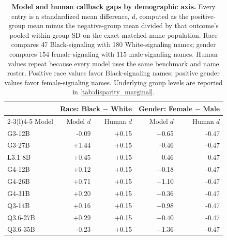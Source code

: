 \begin{table}[H]
\centering
\scriptsize
\setlength{\tabcolsep}{2.2pt}
\begin{tabular}{@{}lrrrr@{}}
\toprule
& \multicolumn{2}{c}{Race: Black $-$ White} & \multicolumn{2}{c}{Gender: Female $-$ Male} \\
\cmidrule(lr){2-3}\cmidrule(l){4-5}
Model & Model $d$ & Human $d$ & Model $d$ & Human $d$ \\
\midrule
G3-12B & -0.09 & +0.15 & +0.65 & -0.47 \\
G3-27B & +1.44 & +0.15 & -0.46 & -0.47 \\
L3.1-8B & +0.45 & +0.15 & +0.46 & -0.47 \\
G4-12B & +0.12 & +0.15 & +0.18 & -0.47 \\
G4-26B & +0.71 & +0.15 & +1.10 & -0.47 \\
G4-31B & +0.20 & +0.15 & +0.36 & -0.47 \\
Q3-14B & +0.16 & +0.15 & +0.98 & -0.47 \\
Q3.6-27B & +0.29 & +0.15 & +0.40 & -0.47 \\
Q3.6-35B & -0.23 & +0.15 & +1.36 & -0.47 \\
\bottomrule
\end{tabular}
\caption{\textbf{Model and human callback gaps by demographic axis.} Every entry is a standardized mean difference, $d$, computed as the positive-group mean minus the negative-group mean divided by that outcome's pooled within-group SD on the exact matched-name population. Race compares 47 Black-signaling with 180 White-signaling names; gender compares 154 female-signaling with 115 male-signaling names. Human values repeat because every model uses the same benchmark and name roster. Positive race values favor Black-signaling names; positive gender values favor female-signaling names. Underlying group levels are reported in \autoref{tab:disparity_marginal}.}
\label{tab:disparity_gaps}
\end{table}

